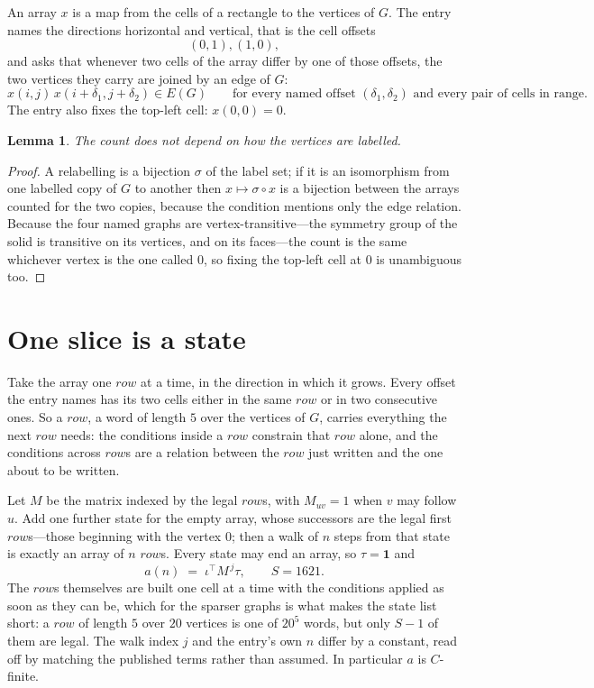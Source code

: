 \documentclass[11pt,a4paper]{article}
\theoremstyle{plain}
\newtheorem{lemma}[theorem]{Lemma}
\theoremstyle{definition}
\begin{document}
An array $x$ is a map from the cells of a rectangle to the vertices of $G$. The entry names the
directions horizontal and vertical, that is the cell offsets
\[
(0,1), (1,0),
\]
and asks that whenever two cells of the array differ by one of those offsets, the two vertices
they carry are joined by an edge of $G$:
\[
x(i,j)\,x(i+\delta_1,j+\delta_2)\in E(G)\qquad
\text{for every named offset } (\delta_1,\delta_2)\text{ and every pair of cells in range.}
\]
The entry also fixes the top-left cell: $x(0,0)=0$.

\begin{lemma}\label{lem:label}
The count does not depend on how the vertices are labelled.
\end{lemma}

\begin{proof}
A relabelling is a bijection $\sigma$ of the label set; if it is an isomorphism from one
labelled copy of $G$ to another then $x\mapsto\sigma\circ x$ is a bijection between the arrays
counted for the two copies, because the condition mentions only the edge relation.
Because the four named graphs are vertex-transitive---the symmetry group of the solid is transitive on its vertices, and on its faces---the count is the same whichever vertex is the one called $0$, so fixing the top-left cell at $0$ is unambiguous too.
\end{proof}

\section{One slice is a state}

Take the array one $row$ at a time, in the direction in which it grows.
Every offset the entry names has its two cells either in the same $row$ or in two
consecutive ones. So a $row$, a word of length $5$ over the vertices of $G$, carries
everything the next $row$ needs: the conditions inside a $row$ constrain that
$row$ alone, and the conditions across $row$s are a relation between the
$row$ just written and the one about to be written.

Let $M$ be the matrix indexed by the legal $row$s, with $M_{uv}=1$ when $v$ may
follow $u$. Add one further state for the empty array, whose successors are the legal first
$row$s---those beginning with the vertex $0$; then a walk of
$n$ steps from that state is exactly an array of $n$ $row$s. Every state may end an
array, so $\tau=\mathbf{1}$ and
\[
a(n)\;=\;\iota^{\!\top}M^{\,j}\tau ,\qquad S=1621.
\]
The $row$s themselves are built one cell at a time with the conditions applied as soon
as they can be, which for the sparser graphs is what makes the state list short: a $row$
of length $5$ over $20$ vertices is one of $20^{5}$ words, but only $S-1$ of them are
legal. The walk index $j$ and the entry's own $n$ differ by a constant, read off by matching the
published terms rather than assumed. In particular $a$ is $C$-finite.
\end{document}
